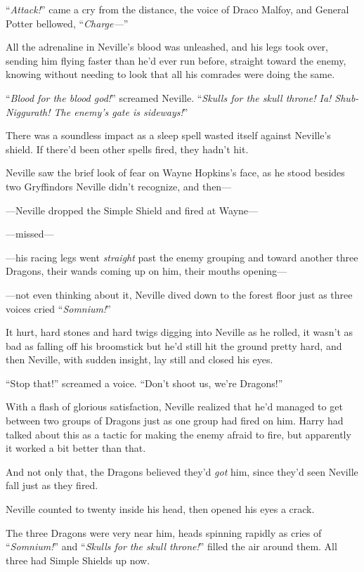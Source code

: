 “\emph{Attack!}” came a cry from the distance, the voice of Draco Malfoy, and General Potter bellowed, “\emph{Charge—}”

All the adrenaline in Neville’s blood was unleashed, and his legs took over, sending him flying faster than he’d ever run before, straight toward the enemy, knowing without needing to look that all his comrades were doing the same.

“\emph{Blood for the blood god!}” screamed Neville. “\emph{Skulls for the skull throne! Ia! Shub-Niggurath! The enemy’s gate is sideways!}”

There was a soundless impact as a sleep spell wasted itself against Neville’s shield. If there’d been other spells fired, they hadn’t hit.

Neville saw the brief look of fear on Wayne Hopkins’s face, as he stood besides two Gryffindors Neville didn’t recognize, and then—

—Neville dropped the Simple Shield and fired at Wayne—

—missed—

—his racing legs went \emph{straight} past the enemy grouping and toward another three Dragons, their wands coming up on him, their mouths opening—

—not even thinking about it, Neville dived down to the forest floor just as three voices cried “\emph{Somnium!}”

It hurt, hard stones and hard twigs digging into Neville as he rolled, it wasn’t as bad as falling off his broomstick but he’d still hit the ground pretty hard, and then Neville, with sudden insight, lay still and closed his eyes.

“Stop that!” screamed a voice. “Don’t shoot us, we’re Dragons!”

With a flash of glorious satisfaction, Neville realized that he’d managed to get between two groups of Dragons just as one group had fired on him. Harry had talked about this as a tactic for making the enemy afraid to fire, but apparently it worked a bit better than that.

And not only that, the Dragons believed they’d \emph{got} him, since they’d seen Neville fall just as they fired.

Neville counted to twenty inside his head, then opened his eyes a crack.

The three Dragons were very near him, heads spinning rapidly as cries of “\emph{Somnium!}” and “\emph{Skulls for the skull throne!}” filled the air around them. All three had Simple Shields up now.

